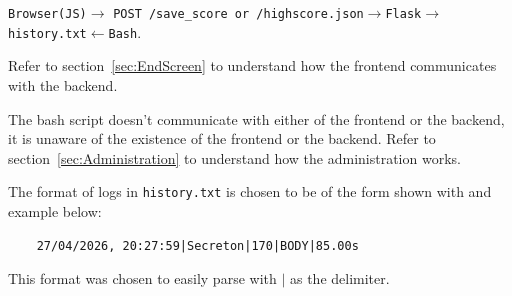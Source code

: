 \documentclass{article}
\begin{document}
\vspace{0.2cm}

\texttt{Browser(JS)}$\rightarrow$ \texttt{POST /save\_score or /highscore.json}$\rightarrow$\texttt{Flask}$\rightarrow$\texttt{history.txt}$\leftarrow$\texttt{Bash}.
\vspace{0.3cm}

Refer to section~\ref{sec:EndScreen} to understand how the frontend communicates with the backend.

The bash script doesn't communicate with either of the frontend or the backend, it is unaware of the existence of the frontend or the backend. Refer to section~\ref{sec:Administration} to understand how the administration works.

The format of logs in \texttt{history.txt} is chosen to be of the form shown with and example below:

\begin{verbatim}
    27/04/2026, 20:27:59|Secreton|170|BODY|85.00s
\end{verbatim}

This format was chosen to easily parse with $|$ as the delimiter.
\end{document}
